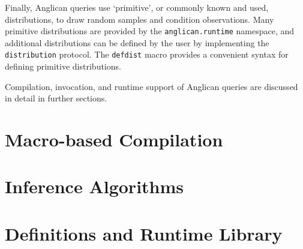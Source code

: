 \documentclass[a4paper]{article}
\begin{document}
Finally, Anglican queries use `primitive', or commonly known
and used, distributions, to draw random samples and condition
observations. Many primitive distributions are provided by the
\texttt{anglican.runtime} namespace, and additional
distributions can be defined by the user by implementing the
\texttt{distribution} protocol. The \texttt{defdist} macro
provides a convenient syntax for defining primitive distributions.

Compilation, invocation, and runtime support of Anglican queries
are discussed in detail in further sections.

\section{Macro-based Compilation}

\section{Inference Algorithms}

\section{Definitions and Runtime Library}




\end{document}
